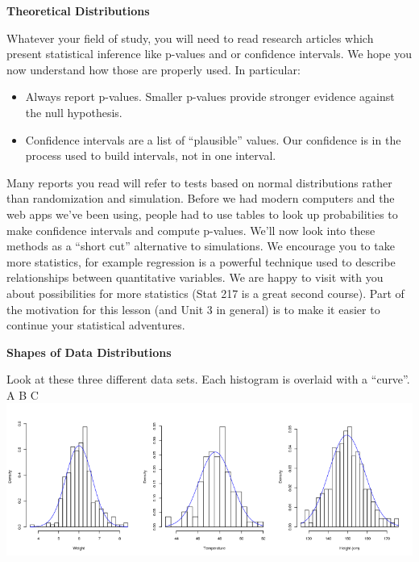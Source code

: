 \def\theTopic{Normal and t Distributions }
\def\dayNum{21 }

 \begin{center}
 {\bf {\large Theoretical Distributions}}
 \end{center}

  Whatever your field of study, you will need to read  research
  articles which present statistical inference like p-values and or
  confidence intervals.  We hope you now understand how those are
  properly used. In particular:
  \begin{itemize}
  \item Always report p-values. Smaller p-values provide stronger
    evidence against the null hypothesis.
  \item Confidence intervals are a list of ``plausible'' values.
    Our confidence is in the process used to build intervals, not
    in one interval. 
  \end{itemize}

  Many reports you read will refer to tests based on normal
  distributions rather than randomization and simulation.
  Before we had modern computers and the web apps we've been using,
  people had to use tables to look up probabilities to make confidence
  intervals and compute p-values.  We'll now look into these methods
  as a ``short cut'' alternative to simulations.
  We encourage you to take more statistics, for example regression 
  is a powerful technique used to describe relationships between
  quantitative variables.    We are happy to visit with you
  about possibilities for more statistics (Stat 217 is a great second
  course).  Part of the motivation for this lesson (and Unit 3 in
  general)  is to make it easier to
  continue your statistical adventures.

 
 \begin{center}
   {\Large\bf  Shapes of Data Distributions}
 \end{center}

  Look at these three different data sets. Each histogram is overlaid
  with a ``curve''. \\
\hspace*{2.6cm}A  \hspace*{5cm}B  \hspace*{4.5cm}C \\
\includegraphics[width=.9\linewidth]{../plots/normals.png}

